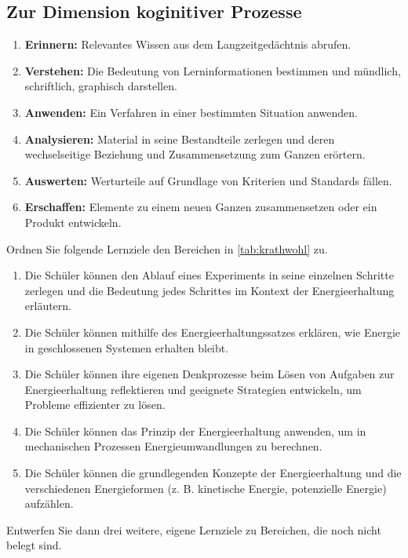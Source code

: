 \subsection{Zur Dimension koginitiver Prozesse}
\begin{enumerate}
	\item \textbf{Erinnern:} Relevantes Wissen aus dem Langzeitgedächtnis abrufen.
	\item \textbf{Verstehen:} Die Bedeutung von Lerninformationen bestimmen und mündlich, schriftlich, graphisch darstellen.
	\item \textbf{Anwenden:} Ein Verfahren in einer bestimmten Situation anwenden.
	\item \textbf{Analysieren:} Material in seine Bestandteile zerlegen und deren wechselseitige Beziehung und Zusammensetzung zum Ganzen erörtern.
	\item \textbf{Auswerten:} Werturteile auf Grundlage von Kriterien und Standards fällen.
	\item \textbf{Erschaffen:} Elemente zu einem neuen Ganzen zusammensetzen oder ein Produkt entwickeln.
\end{enumerate}

\begin{uea}
	Ordnen Sie folgende Lernziele den Bereichen in \cref{tab:krathwohl} zu.
	\begin{enumerate}[label=\alph*.]
		\item Die Schüler können den Ablauf eines Experiments in seine einzelnen Schritte zerlegen und die Bedeutung jedes Schrittes im Kontext der Energieerhaltung erläutern.
		\item Die Schüler können mithilfe des Energieerhaltungssatzes erklären, wie Energie in geschlossenen Systemen erhalten bleibt.
		\item Die Schüler können ihre eigenen Denkprozesse beim Lösen von Aufgaben zur Energieerhaltung reflektieren und geeignete Strategien entwickeln, um Probleme effizienter zu lösen.
		\item Die Schüler können das Prinzip der Energieerhaltung anwenden, um in mechanischen Prozessen Energieumwandlungen zu berechnen.
		\item Die Schüler können die grundlegenden Konzepte der Energieerhaltung und die verschiedenen Energieformen (z. B. kinetische Energie, potenzielle Energie) aufzählen.
	\end{enumerate}
	Entwerfen Sie dann drei weitere, eigene Lernziele zu Bereichen, die noch nicht belegt sind.
	
	\flushright{}
\end{uea}

